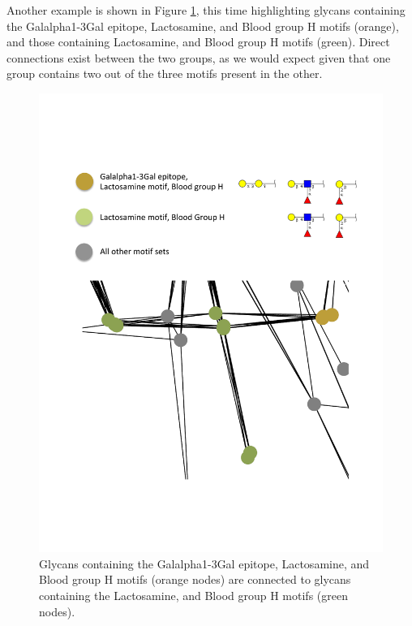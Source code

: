 \documentclass[12pt,a4paper]{article}
\begin{document}
Another example is shown in Figure \ref{fig:Galalpha1-3Gal_epitope_Lactosamine_motif_Blood_group_H_vs_Lactosamine_motif_Blood_group_H}, this time highlighting glycans containing the Galalpha1-3Gal epitope, Lactosamine, and Blood group H motifs (orange), and those containing Lactosamine, and Blood group H motifs (green). Direct connections exist between the two groups, as we would expect given that one group contains two out of the three motifs present in the other.

\begin{figure}[H]
\centering 
\includegraphics[scale=0.85]{motif_similarity_exploration/Galalpha1-3Gal_epitope__Lactosamine_motif__Blood_group_H_vs_Lactosamine_motif__Blood_group_H.pdf} 
\caption{Glycans containing the Galalpha1-3Gal epitope, Lactosamine, and Blood group H motifs (orange nodes) are connected to glycans containing the Lactosamine, and Blood group H motifs (green nodes).}
\label{fig:Galalpha1-3Gal_epitope_Lactosamine_motif_Blood_group_H_vs_Lactosamine_motif_Blood_group_H}
\end{figure}
\end{document}
